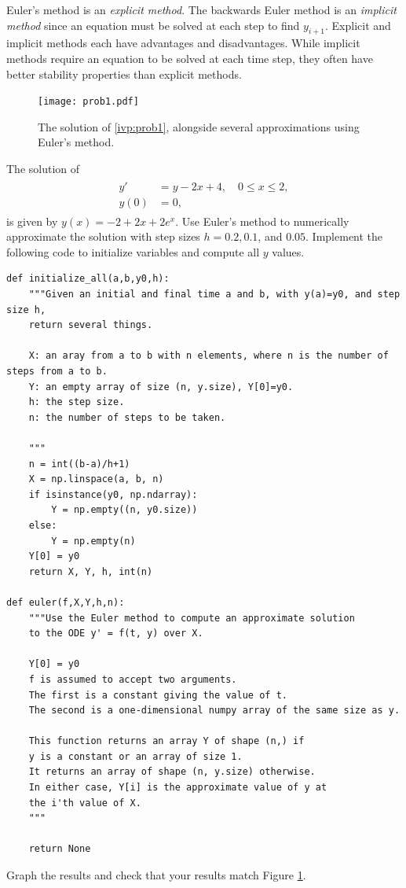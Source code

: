 Euler's method is an \textit{explicit method}. 
The backwards Euler method is an \textit{implicit method} since an equation must be solved at each step to find $y_{i+1}$. 
Explicit and implicit methods each have advantages and disadvantages. 
While implicit methods require an equation to be solved at each time step, they often have better stability properties than explicit methods.

\begin{figure}[ht]
\centering
\texttt{[image: prob1.pdf]}
\caption{The solution of \eqref{ivp:prob1}, alongside several approximations using Euler's method.}
\label{ivp:euler}
\end{figure}


\begin{problem} The solution of
\begin{align}
	\begin{split}
		y' &= y - 2x + 4,\quad 0 \leq x \leq 2, \\
		y(0) &= 0,
	\end{split}\label{ivp:prob1}
\end{align}
is given by $y(x) = -2+2x + 2e^x.$
Use Euler's method to numerically approximate the solution with step sizes $h = 0.2, 0.1$, and $0.05.$ 
Implement the following code to initialize variables and compute all $y$ values.

\begin{lstlisting}
def initialize_all(a,b,y0,h):
    """Given an initial and final time a and b, with y(a)=y0, and step size h,
    return several things.
    
    X: an aray from a to b with n elements, where n is the number of steps from a to b.
    Y: an empty array of size (n, y.size), Y[0]=y0.
    h: the step size.
    n: the number of steps to be taken.
    
    """
    n = int((b-a)/h+1)
    X = np.linspace(a, b, n)
    if isinstance(y0, np.ndarray):
        Y = np.empty((n, y0.size))
    else:
        Y = np.empty(n)
    Y[0] = y0
    return X, Y, h, int(n)

def euler(f,X,Y,h,n):
    """Use the Euler method to compute an approximate solution
    to the ODE y' = f(t, y) over X.

    Y[0] = y0
    f is assumed to accept two arguments.
    The first is a constant giving the value of t.
    The second is a one-dimensional numpy array of the same size as y.

    This function returns an array Y of shape (n,) if
    y is a constant or an array of size 1.
    It returns an array of shape (n, y.size) otherwise.
    In either case, Y[i] is the approximate value of y at
    the i'th value of X.
    """
    
    return None
\end{lstlisting}

Graph the results and check that your results match Figure \ref{ivp:euler}.
\end{problem}

